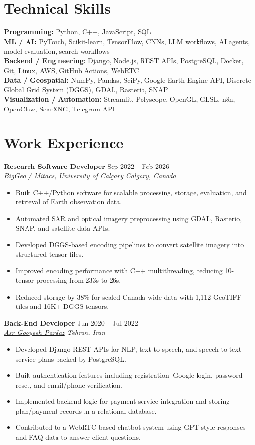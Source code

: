 \documentclass[a4paper,10pt]{article}
\newcommand{\resumeSubheading}[4]{
    \textbf{#1} \hfill #2 \\
    \textit{#3} \hfill \textit{#4}
}
\begin{document}
\section*{Technical Skills}

\textbf{Programming:} Python, C++, JavaScript, SQL \\
\textbf{ML / AI:} PyTorch, Scikit-learn, TensorFlow, CNNs, LLM workflows, AI agents, model evaluation, search workflows \\
\textbf{Backend / Engineering:} Django, Node.js, REST APIs, PostgreSQL, Docker, Git, Linux, AWS, GitHub Actions, WebRTC \\
\textbf{Data / Geospatial:} NumPy, Pandas, SciPy, Google Earth Engine API, Discrete Global Grid System (DGGS), GDAL, Rasterio, SNAP \\
\textbf{Visualization / Automation:} Streamlit, Polyscope, OpenGL, GLSL, n8n, OpenClaw, SearXNG, Telegram API


\section*{Work Experience}

\resumeSubheading
{Research Software Developer}
{Sep 2022 -- Feb 2026}
{\href{https://biggeo.com}{BigGeo} / \href{https://www.mitacs.ca/}{Mitacs}, University of Calgary}
{Calgary, Canada}
\begin{itemize}[leftmargin=0.25in]
    \item Built C++/Python software for scalable processing, storage, evaluation, and retrieval of Earth observation data.
    \item Automated SAR and optical imagery preprocessing using GDAL, Rasterio, SNAP, and satellite data APIs.
    \item Developed DGGS-based encoding pipelines to convert satellite imagery into structured tensor files.
    \item Improved encoding performance with C++ multithreading, reducing 10-tensor processing from 233s to 26s.
    \item Reduced storage by 38\% for scaled Canada-wide data with 1,112 GeoTIFF tiles and 16K+ DGGS tensors.
\end{itemize}

\resumeSubheading
{Back-End Developer}
{Jun 2020 -- Jul 2022}
{\href{https://asr-gooyesh.com/en/}{Asr Gooyesh Pardaz}}
{Tehran, Iran}
\begin{itemize}[leftmargin=0.25in]
    \item Developed Django REST APIs for NLP, text-to-speech, and speech-to-text service plans backed by PostgreSQL.
    \item Built authentication features including registration, Google login, password reset, and email/phone verification.
    \item Implemented backend logic for payment-service integration and storing plan/payment records in a relational database.
    \item Contributed to a WebRTC-based chatbot system using GPT-style responses and FAQ data to answer client questions.
\end{itemize}
\end{document}
